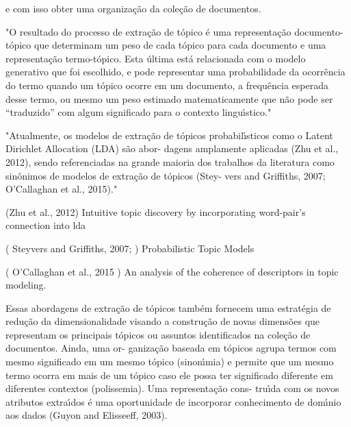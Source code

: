 e com isso obter uma organização da coleção de documentos.











"O resultado do processo de extração de tópico é uma representação documento-tópico que determinam um peso de cada tópico para cada documento e uma representação termo-tópico. Esta última está relacionada com o modelo generativo que foi escolhido, e pode representar uma probabilidade da ocorrência do termo quando um tópico ocorre em um documento, a frequência esperada desse termo, ou mesmo um peso estimado matematicamente que não pode ser “traduzido” com algum significado para o contexto linguı́stico."



"Atualmente, os modelos de extração de tópicos probabilı́sticos como o Latent Dirichlet Allocation (LDA) são abor- dagens amplamente aplicadas (Zhu et al., 2012), sendo referenciadas na grande maioria dos trabalhos da literatura como sinônimos de modelos de extração de tópicos (Stey- vers and Griffiths, 2007; O’Callaghan et al., 2015)."  

(Zhu et al., 2012)
Intuitive topic discovery by incorporating word-pair’s connection into lda

( Steyvers and Griffiths, 2007; )
Probabilistic Topic Models

( O’Callaghan et al., 2015 )
An analysis of the coherence of descriptors in topic modeling.







Essas abordagens de extração de tópicos também fornecem uma estratégia
de redução da dimensionalidade visando a construção de novas dimensões que representam
os principais tópicos ou assuntos identificados na coleção de documentos. Ainda, uma or-
ganização baseada em tópicos agrupa termos com mesmo significado em um mesmo tópico
(sinonı́mia) e permite que um mesmo termo ocorra em mais de um tópico caso ele possa
ter significado diferente em diferentes contextos (polissemia). Uma representação cons-
truı́da com os novos atributos extraı́dos é uma oportunidade de incorporar conhecimento
de domı́nio aos dados (Guyon and Elisseeff, 2003).


